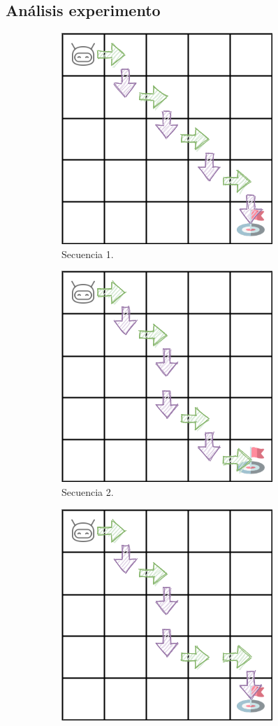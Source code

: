 \subsection{Análisis experimento }
\begin{figure}
    \centering
    \begin{subfigure}{.35\textwidth}
        \centering
        \includegraphics[scale=0.4]{cap5_experimentacion/images/dim5_actions_5.png}
        \caption{Secuencia 1.}
        \label{fig:seq1}
    \end{subfigure}%
    \begin{subfigure}{.35\textwidth}
        \centering
        \includegraphics[scale=0.4]{cap5_experimentacion/images/dim5_lr0.01_ep0.7_139.png}
        \caption{Secuencia 2.}
        \label{fig:seq2}
    \end{subfigure}%
    \begin{subfigure}{.35\textwidth}
        \centering
        \includegraphics[scale=0.4]{cap5_experimentacion/images/dim5_lr0.01_ep0.7_7.png}

\end{subfigure}
\end{figure}
